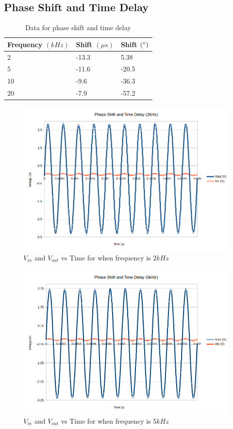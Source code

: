 \documentclass[10pt]{article}
\begin{document}
\subsection*{Phase Shift and Time Delay}
\begin{table}[H]
	\centering
	\begin{tabular}{lll}
		\hline
		Frequency $(kHz)$ & Shift $(\mu s)$ & Shift $(\degree)$\\
		\hline
		2 & -13.3 & 5.38\\
		5 & -11.6 & -20.5\\
		10 & -9.6 & -36.3\\
		20 & -7.9 & -57.2\\
		\hline
	\end{tabular}
	\caption{Data for phase shift and time delay}
\end{table}
\begin{figure}[H]
	\centering
	\includegraphics[width=\textwidth]{PhaseShift2.png}
	\caption{$V_{in}$ and $V_{out}$ vs Time for when frequency is $2kHz$}
\end{figure}
\begin{figure}[H]
	\centering
	\includegraphics[width=\textwidth]{PhaseShift5.png}
	\caption{$V_{in}$ and $V_{out}$ vs Time for when frequency is $5kHz$}
\end{figure}
\end{document}
